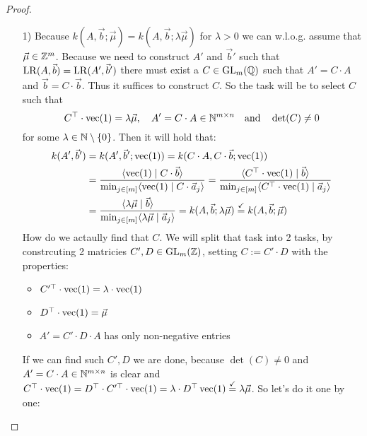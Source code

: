 \begin{proof}
    \begin{enumerate}
        \item[1)] Because $k(A, \vec b; \vec \mu) = k(A, \vec b; \lambda \vec \mu)$ for $\lambda > 0$ we can w.l.o.g. assume that $\vec \mu \in \mathbb{Z}^m$. Because we need to construct $A'$ and $\vec b'$ such that $\operatorname{LR}(A, \vec b) = \operatorname{LR}(A', \vec b')$ there must exist a $C \in \operatorname{GL}_m(\mathbb{Q})$ such that $A' = C\cdot A$ and $\vec b = C\cdot \vec b$. Thus it suffices to construct $C$. So the task will be to select $C$ such that
        $$C^\top \cdot \operatorname{vec}(1) = \lambda \vec\mu, \quad A' = C\cdot A \in \mathbb{N}^{m \times n} \quad \textrm{and} \quad \det(C) \neq 0$$
        for some $\lambda \in \mathbb{N} \setminus \{0\}$. Then it will hold that:
        \begin{align*}
            k(A', \vec b') &= k(A', \vec b'; \operatorname{vec}(1)) = k(C \cdot A, C \cdot \vec b; \operatorname{vec}(1))\\
            &= \frac{\langle \operatorname{vec}(1) \mid C \cdot \vec b \rangle}{\min_{j \in [m]} \langle \operatorname{vec}(1) \mid C \cdot \vec a_j \rangle} = \frac{\langle C^\top \cdot \operatorname{vec}(1) \mid \vec b \rangle}{\min_{j \in [m]} \langle C^\top \cdot \operatorname{vec}(1) \mid \vec a_j \rangle}\\
            &= \frac{\langle \lambda\vec{\mu} \mid \vec b \rangle}{\min_{j \in [m]} \langle \lambda\vec \mu \mid \vec a_j \rangle} = k(A, \vec b; \lambda\vec\mu) \stackrel{\checkmark}{=} k(A, \vec b; \vec\mu)
        \end{align*}
        How do we actaully find that $C$. We will split that task into 2 tasks, by constrcuting 2 matricies $C', D  \in \operatorname{GL}_m(\mathbb{Z})$, setting $C := C' \cdot D$ with the properties:
        \begin{itemize}
            \item $C'^\top \cdot \operatorname{vec}(1) = \lambda \cdot \operatorname{vec}(1)$
            \item $D^\top \cdot \operatorname{vec}(1) = \vec\mu$
            \item $A' = C' \cdot D\cdot A$ has only non-negative entries
        \end{itemize}
        If we can find such $C', D$ we are done, because $\det(C) \neq 0$ and $ A' = C\cdot A \in \mathbb{N}^{m \times n}$ is clear and $C^\top \cdot \operatorname{vec}(1) = D^\top \cdot C'^\top\cdot \operatorname{vec}(1) = \lambda \cdot D^\top \operatorname{vec}(1) \stackrel{\checkmark}{=}\lambda\vec\mu$. So let's do it one by one:


\end{enumerate}
\end{proof}
